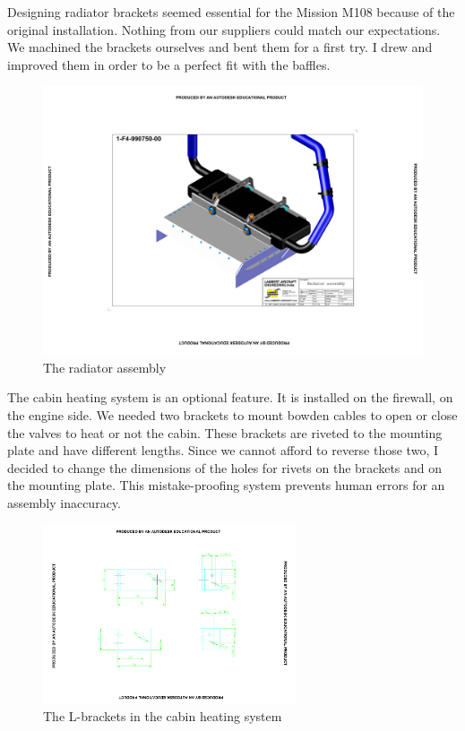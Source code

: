 \documentclass[11pt,a4paper]{article}
\begin{document}
Designing radiator brackets seemed essential for the Mission M108 because of the original installation. Nothing from our suppliers could match our expectations. We machined the brackets ourselves and bent them for a first try. I drew and improved them in order to be a perfect fit with the baffles.

\begin{figure}[ht!]
	\begin{center}
		\includegraphics[width=15cm,trim = 5cm 5cm 5cm 5cm, clip]{pics/PIC008.pdf}
		\caption{The radiator assembly}
		\label{fig:PIC008}
	\end{center}
\end{figure}

\bigskip

The cabin heating system is an optional feature. It is installed on the firewall, on the engine side. We needed two brackets to mount bowden cables to open or close the valves to heat or not the cabin. These brackets are riveted to the mounting plate and have different lengths. Since we cannot afford to reverse those two, I decided to change the dimensions of the holes for rivets on the brackets and on the mounting plate. This mistake-proofing system prevents human errors for an assembly inaccuracy.

\begin{figure}[ht!]
	\begin{center}
		\includegraphics[width=7.5cm,trim = 6cm 4cm 6cm 3cm, clip]{pics/PIC009.pdf}
		\caption{The L-brackets in the cabin heating system}
		\label{fig:PIC009}
	\end{center}
\end{figure}
\end{document}
